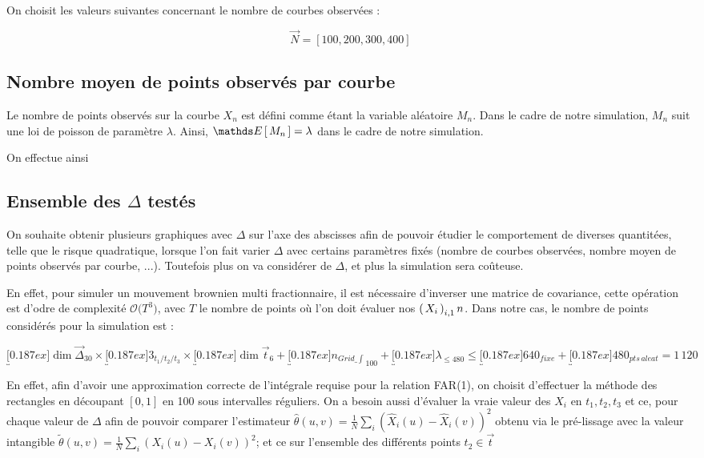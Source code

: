 On choisit les valeurs suivantes concernant le nombre de courbes observées :

$$
	\vec N = [ 100, 200, 300, 400]
$$
\subsection{Nombre moyen de points observés par courbe}

Le nombre de points observés sur la courbe $X_n$ est défini comme étant la variable aléatoire $M_n$. Dans le cadre de notre simulation, $M_n$ suit une loi de poisson de paramètre $\lambda$. Ainsi, $\esperance{M_n} = \lambda$ dans le cadre de notre simulation.

On effectue ainsi

\subsection{Ensemble des $\Delta$ testés}

On souhaite obtenir plusieurs graphiques avec $\Delta$ sur l'axe des abscisses afin de pouvoir étudier le comportement de diverses quantitées, telle que le risque quadratique, lorsque l'on fait varier $\Delta$ avec certains paramètres fixés (nombre de courbes observées, nombre moyen de points observés par courbe, ...). Toutefois plus on va considérer de $\Delta$, et plus la simulation sera coûteuse.

En effet, pour simuler un mouvement brownien multi fractionnaire, il est nécessaire d'inverser une matrice de covariance, cette opération est d'odre de complexité $\mathcal O \bigl( T^3 \bigr)$, avec $T$ le nombre de points où l'on doit évaluer nos $\left( \, {X} _ {i} \, \right)_{i, 1} n$. Dans notre cas, le nombre de points considérés pour la simulation est :

$$\underbracket[0.187ex]{\dim \vec\Delta}_{30} \times \underbracket[0.187ex]{3}_{t_1 / t_2 / t_3} \times \underbracket[0.187ex]{\dim \vec t}_{6} + \underbracket[0.187ex]{n_{Grid\_\int}}_{100} + \underbracket[0.187ex]{\lambda}_{\leq 480} \leq \underbracket[0.187ex]{640}_{fixe} + \underbracket[0.187ex]{480}_{pts \, aleat} = 1 \, 120$$

En effet, afin d'avoir une approximation correcte de l'intégrale requise pour la relation FAR(1), on choisit d'effectuer la méthode des rectangles en découpant $[0,1]$ en 100 sous intervalles réguliers. On a besoin aussi d'évaluer la vraie valeur des $X_i$ en $t_1, t_2, t_3$ et ce, pour chaque valeur de $\Delta$ afin de pouvoir comparer l'estimateur $\hat \theta(u,v) = \frac 1 N \sum_i (\widehat X_i(u) - \widehat X_i(v))^2$ obtenu via le pré-lissage avec la valeur intangible $\tilde \theta(u,v) = \frac 1 N \sum_i ( X_i(u) -  X_i(v))^2$; et ce sur l'ensemble des différents points $t_2 \in \vec t$



